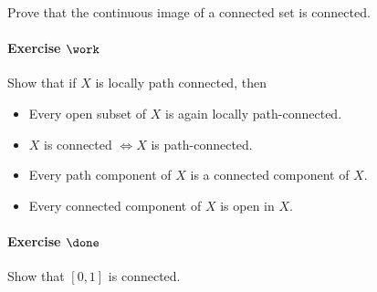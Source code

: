 Prove that the continuous image of a connected set is connected.

\hypertarget{exercise-work-10}{%
\paragraph{\texorpdfstring{Exercise
\(\work\)}{Exercise \textbackslash work}}\label{exercise-work-10}}

Show that if \(X\) is locally path connected, then

\begin{itemize}
\tightlist
\item
  Every open subset of \(X\) is again locally path-connected.
\item
  \(X\) is connected \(\iff X\) is path-connected.
\item
  Every path component of \(X\) is a connected component of \(X\).
\item
  Every connected component of \(X\) is open in \(X\).
\end{itemize}

\hypertarget{exercise-done-1}{%
\paragraph{\texorpdfstring{Exercise
\(\done\)}{Exercise \textbackslash done}}\label{exercise-done-1}}

Show that \([0, 1]\) is connected.

